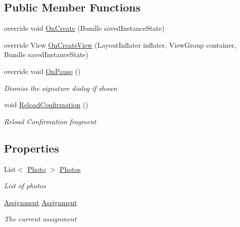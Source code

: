 \subsection*{Public Member Functions}
\begin{DoxyCompactItemize}
\item 
override void \hyperlink{class_field_service_1_1_android_1_1_fragments_1_1_confirmation_fragment_aa3c6e81280c63e45b5721237ab3a43ce}{On\+Create} (Bundle saved\+Instance\+State)
\item 
override View \hyperlink{class_field_service_1_1_android_1_1_fragments_1_1_confirmation_fragment_a6e255cfcc5e2006f1e76362d33d2d17e}{On\+Create\+View} (Layout\+Inflater inflater, View\+Group container, Bundle saved\+Instance\+State)
\item 
override void \hyperlink{class_field_service_1_1_android_1_1_fragments_1_1_confirmation_fragment_ae7784150fa7a058ec6ee9794463cd798}{On\+Pause} ()
\begin{DoxyCompactList}\small\item\em Dismiss the signature dialog if shown \end{DoxyCompactList}\item 
void \hyperlink{class_field_service_1_1_android_1_1_fragments_1_1_confirmation_fragment_a714060095eb3de3492f7e474582c95f8}{Reload\+Confirmation} ()
\begin{DoxyCompactList}\small\item\em Reload Confirmation fragment \end{DoxyCompactList}\end{DoxyCompactItemize}
\subsection*{Properties}
\begin{DoxyCompactItemize}
\item 
List$<$ \hyperlink{class_field_service_1_1_data_1_1_photo}{Photo} $>$ \hyperlink{class_field_service_1_1_android_1_1_fragments_1_1_confirmation_fragment_af6f4fa7e57cb6ca06c33e13319d5659c}{Photos}
\begin{DoxyCompactList}\small\item\em List of photos \end{DoxyCompactList}\item 
\hyperlink{class_field_service_1_1_data_1_1_assignment}{Assignment} \hyperlink{class_field_service_1_1_android_1_1_fragments_1_1_confirmation_fragment_a705b54cca438073dd71c47fa84b8cddc}{Assignment}
\begin{DoxyCompactList}\small\item\em The current assignment \end{DoxyCompactList}\end{DoxyCompactItemize}


